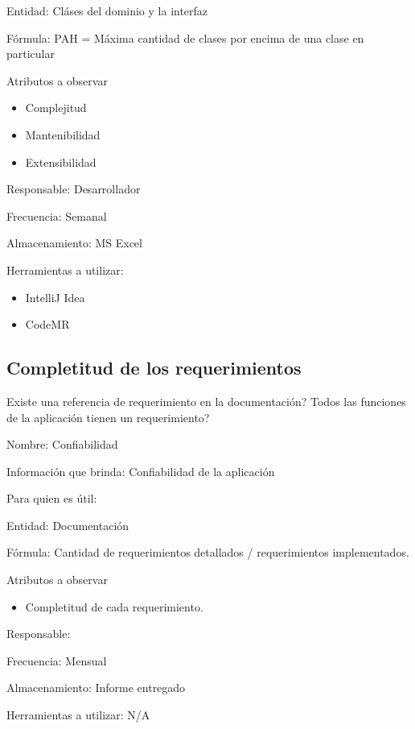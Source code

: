 {{        \item Entidad: Cláses del dominio y la interfaz
        \item Fórmula: PAH = Máxima cantidad de clases por encima de una clase en particular
        \item Atributos a observar
            \begin{itemize}
                \item Complejitud
                \item Mantenibilidad
                \item Extensibilidad
            \end{itemize}
        \item Responsable: Desarrollador
        \item Frecuencia: Semanal
        \item Almacenamiento: MS Excel
        \item Herramientas a utilizar:
        \begin{itemize}
            \item IntelliJ Idea
            \item CodeMR
        \end{itemize}
    }
}

    
    
\subsection{Completitud de los requerimientos}

 {
    \pregunta Existe una referencia de requerimiento en la documentación?
    \pregunta Todos las funciones de la aplicación tienen un requerimiento?
} {
     {
        \item Nombre: Confiabilidad
        \item Información que brinda: Confiabilidad de la aplicación
        \item Para quien es útil: \pmo
        \item Entidad: Documentación
        \item Fórmula: Cantidad de requerimientos detallados / requerimientos implementados.
        \item Atributos a observar
            \begin{itemize}
                \item Completitud de cada requerimiento.
            \end{itemize}
        \item Responsable: \analista
        \item Frecuencia: Mensual
        \item Almacenamiento: Informe entregado
        \item Herramientas a utilizar: N/A
    }
}   

